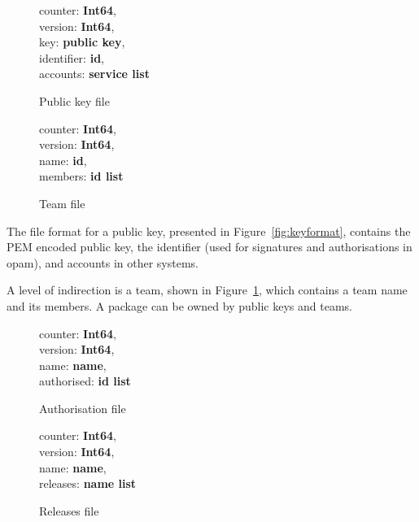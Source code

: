 \documentclass[nocopyrightspace]{sigplanconf}
\begin{document}
\begin{figure}[h]
  \begin{minipage}{\hsize}
    \begin{minipage}{.4 \hsize}
counter: \textbf{Int64},\\
version: \textbf{Int64},\\
key: \textbf{public key},\\
identifier: \textbf{id},\\
accounts: \textbf{service list}
 \caption{\label{fig:keyformat} Public key file}
    \end{minipage}
    \hspace*{.5cm}
    \begin{minipage}{.4 \hsize}
counter: \textbf{Int64},\\
version: \textbf{Int64},\\
name: \textbf{id},\\
members: \textbf{id list}
 \caption{\label{fig:teamformat} Team file}
    \end{minipage}
  \end{minipage}
\end{figure}

The file format for a public key, presented in Figure~\ref{fig:keyformat}, contains the PEM encoded public key, the identifier (used for signatures and authorisations in opam), and accounts in other systems.

A level of indirection is a team, shown in Figure~\ref{fig:teamformat}, which contains a team name and its members.  A package can be owned by public keys and teams.

\begin{figure}[h]
  \begin{minipage}{\hsize}
    \begin{minipage}{.4 \hsize}
counter: \textbf{Int64},\\
version: \textbf{Int64},\\
name: \textbf{name},\\
authorised: \textbf{id list}
 \caption{\label{fig:authformat} Authorisation file}
    \end{minipage}
    \hspace*{.5cm}
    \begin{minipage}{.4 \hsize}
counter: \textbf{Int64},\\
version: \textbf{Int64},\\
name: \textbf{name},\\
releases: \textbf{name list}
 \caption{\label{fig:releasesformat} Releases file}
    \end{minipage}
  \end{minipage}
\end{figure}
\end{document}
